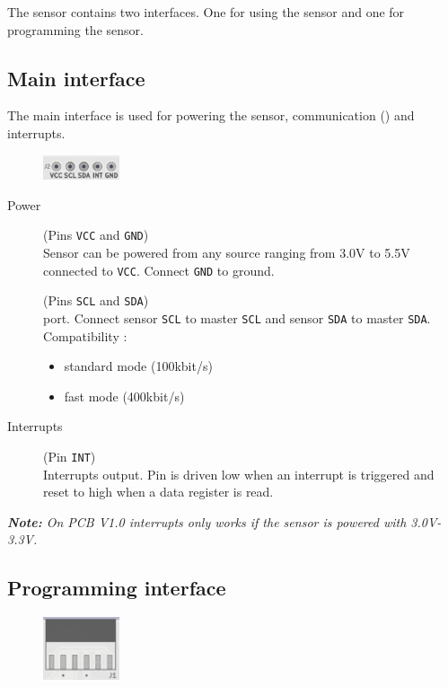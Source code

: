 The sensor contains two interfaces. One for using the sensor and one for programming the sensor.
\begin{multicols}{2}
\subsection{Main interface}
The main interface is used for powering the sensor, communication (\iic) and interrupts.
\begin{figure}[H]
 \centering
 \includegraphics[width=0.2\textwidth]{../img/J2.png}
\end{figure}

\begin{description}
	\item[Power] (Pins \texttt{VCC} and \texttt{GND}) \\
	Sensor can be powered from any source ranging from 3.0V to 5.5V connected to \texttt{VCC}. Connect \texttt{GND} to ground. 
	
	\item[\iic] (Pins \texttt{SCL} and \texttt{SDA}) \\
	\iic port. Connect sensor \texttt{SCL} to master \texttt{SCL} and sensor \texttt{SDA} to master \texttt{SDA}.\\
	Compatibility : \cite{i2cspec} \cite{microchipDS}
	\begin{itemize}
		\item standard mode (100kbit/s)
		\item fast mode (400kbit/s)
	\end{itemize}
	
	\item[Interrupts] (Pin \texttt{INT}) \\
	Interrupts output. Pin is driven low when an interrupt is triggered and reset to high when a data register is read.
\end{description}
	\textit{\textbf{Note:} On PCB V1.0 interrupts only works if the sensor is powered with 3.0V-3.3V.}

\columnbreak

\subsection{Programming interface}
\begin{figure}[H]
 \centering
 \includegraphics[width=0.2\textwidth]{../img/J1.png}
\end{figure}


\end{multicols}
